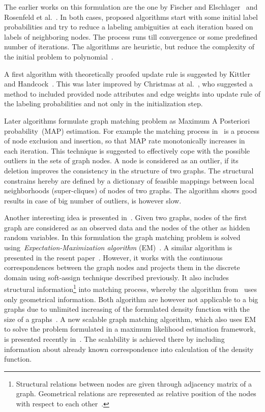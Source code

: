 The earlier works on this formulation are the one by Fischer and Elschlager~\cite{Fischler1973} and Rosenfeld et al.~\cite{Rosenfeld1976}. In both cases, proposed algorithms start with some initial label probabilities and try to reduce a labeling ambiguities at each iteration based on labels of neighboring nodes. The process runs till convergence or some predefined number of iterations. The algorithms are heuristic, but reduce the complexity of the initial problem to polynomial~\cite{Christmas1995}.

A first algorithm with theoretically proofed update rule is suggested by Kittler and Handcock~\cite{Hancock_Kittler}. This was later improved by Christmas at al.~\cite{Christmas1995}, who suggested a method to included provided node attributes and edge weights into update rule of the labeling probabilities and not only in the initialization step.

Later algorithms formulate graph matching problem as Maximum A Posteriori probability~(MAP) estimation. For example the matching process in~\cite{Hancock_StrucMatch} is a process of node exclusion and insertion, so that MAP rate monotonically increases in each iteration. This technique is suggested to effectively cope with the possible outliers in the sets of graph nodes. A node is considered as an outlier, if its deletion improves the consistency in the structure of two graphs. The structural constrains hereby are defined by a dictionary of feasible mappings between local neighborhoods (super-cliques) of nodes of two graphs. The algorithm shows good results in case of big number of outliers, is however slow.

Another interesting idea is presented in~\cite{Hancock_EM_SVD}. Given two graphs, nodes of the first graph are considered as an observed data and the nodes of the other as hidden random variables. In this formulation the graph matching problem is solved using~\emph{Expectation-Maximization algorithm} (EM)~\cite{EM_Dempster1977}. A similar algorithm is presented in the resent paper~\cite{Sanrom2012}. However, it works with the continuous correspondences between the graph nodes and projects them in the discrete domain using soft-assign technique described previously. It also includes structural information\footnote{Structural relations between nodes are given through adjacency matrix of a graph. Geometrical relations are represented as relative position of the nodes with respect to each other~\cite{Sanrom2012}.} into matching process, whereby the algorithm from~\cite{Hancock_EM_SVD} uses only geometrical information. Both algorithm are however not applicable to a big graphs due to unlimited increasing of the formulated density function with the size of a graphs~\cite{Armiti2014}. A new scalable graph matching algorithm, which also uses EM to solve the problem formulated in a maximum likelihood estimation framework, is presented recently in~\cite{Armiti2014}. The scalability is achieved there by including information about already known correspondence into calculation of the density function.
